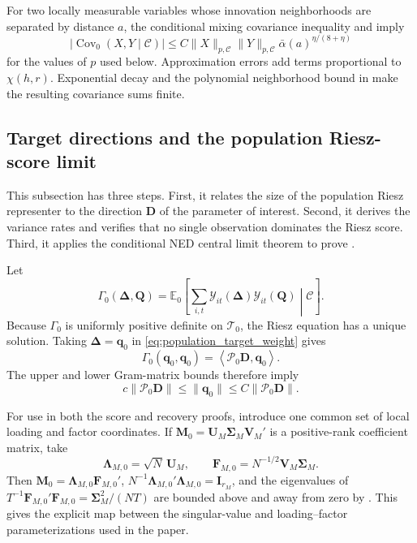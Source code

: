 \documentclass[11pt]{article}
\numberwithin{equation}{section}
\theoremstyle{remark}
\newcommand{\Ezero}{\mathbb E_0}
\newcommand{\ip}[2]{\left\langle #1,#2\right\rangle}
\newcommand{\bq}{\bm q}
\newcommand{\bD}{\bm D}
\newcommand{\bM}{\bm M}
\newcommand{\bQ}{\bm Q}
\newcommand{\bU}{\bm U}
\newcommand{\bV}{\bm V}
\newcommand{\bDelta}{\bm\Delta}
\newcommand{\bSigma}{\bm\Sigma}
\newcommand{\calP}{\mathcal P}
\newcommand{\calT}{\mathcal T}
\begin{document}
For two locally measurable variables whose innovation neighborhoods are separated by distance $a$, the conditional mixing covariance inequality and  imply
\begin{equation}
\label{eq:conditional_covariance_bound}
\left|
\operatorname{Cov}_0(X,Y\mid\mathscr C)
\right|
\le
C
\|X\|_{p,\mathscr C}
\|Y\|_{p,\mathscr C}
\bar\alpha(a)^{\eta/(8+\eta)}
\end{equation}
for the values of $p$ used below. Approximation errors add terms proportional to $\chi(h,r)$. Exponential decay and the polynomial neighborhood bound in  make the resulting covariance sums finite.

\subsection{Target directions and the population Riesz-score limit}
\label{app:population}

This subsection has three steps. First, it relates the size of the population Riesz representer to the direction $\bD$ of the parameter of interest. Second, it derives the variance rates and verifies that no single observation dominates the Riesz score. Third, it applies the conditional NED central limit theorem to prove .

Let
$$
\Gamma_0(\bDelta,\bQ)
=
\Ezero\!\left[
\sum_{i,t}
\mathcal Y_{it}(\bDelta)
\mathcal Y_{it}(\bQ)
\middle|\mathscr C
\right].
$$
Because $\Gamma_0$ is uniformly positive definite on $\calT_0$, the Riesz equation has a unique solution. Taking $\bDelta=\bq_0$ in \eqref{eq:population_target_weight} gives
\begin{equation}
\label{eq:q_norm_identity}
\Gamma_0(\bq_0,\bq_0)
=
\ip{\calP_0\bD}{\bq_0}.
\end{equation}
The upper and lower Gram-matrix bounds therefore imply
\begin{equation}
\label{eq:q_target_norm_equivalence}
c\|\calP_0\bD\|
\le
\|\bq_0\|
\le
C\|\calP_0\bD\|.
\end{equation}

For use in both the score and recovery proofs, introduce one common set of local loading and factor coordinates. If $\bM_0=\bU_M\bSigma_M\bV_M'$ is a positive-rank coefficient matrix, take
$$
\bm\Lambda_{M,0}=\sqrt N\,\bU_M,
\qquad
\bm F_{M,0}=N^{-1/2}\bV_M\bSigma_M.
$$
Then $\bM_0=\bm\Lambda_{M,0}\bm F_{M,0}'$, $N^{-1}\bm\Lambda_{M,0}'\bm\Lambda_{M,0}=\bm I_{r_M}$, and the eigenvalues of $T^{-1}\bm F_{M,0}'\bm F_{M,0}=\bSigma_M^2/(NT)$ are bounded above and away from zero by . This gives the explicit map between the singular-value and loading--factor parameterizations used in the paper.
\end{document}
